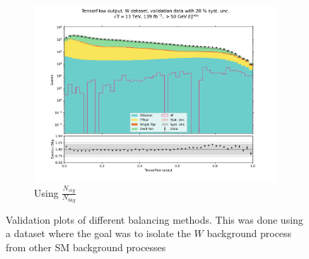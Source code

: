 \documentclass[12pt, a4paper]{book}
\begin{document}
\begin{figure}[!ht]
\begin{subfigure}[b]{0.49\textwidth}
         \includegraphics[width=1\textwidth]{Balanced/VAL.pdf}
         \caption{Using $\frac{N_{sig}}{N_{bkg}}$}\label{fig:WVALW}
      \end{subfigure}
      \caption[Validation plots for different balancing methods on NN]{Validation plots of different balancing methods. 
      This was done using a dataset where the goal was to isolate the $W$ background process from other SM background processes}\label{fig:WVAL}
\end{figure}
\end{document}
